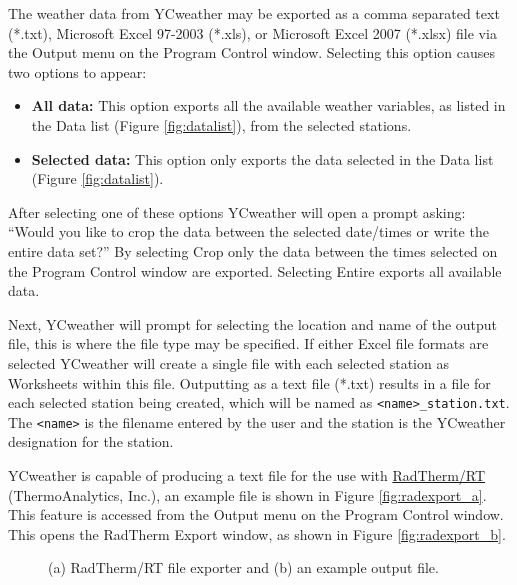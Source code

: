 The weather data from YCweather may be exported as a comma separated text (*.txt), Microsoft Excel 97-2003 (*.xls), or Microsoft Excel 2007 (*.xlsx) file via the Output menu on the Program Control window. Selecting this option causes two options to appear:
\begin{itemize}
     \item \textbf{All data:} This option exports all the available weather variables, as listed in the Data list (Figure \ref{fig:datalist}),  from the selected stations.
	\item \textbf{Selected data:} This option only exports the data selected in the Data list (Figure \ref{fig:datalist}).
\end{itemize} 

After selecting one of these options YCweather will open a prompt asking: ``Would you like to crop the data between the selected date/times or write the entire data set?''  By selecting Crop only the data between the times selected on the Program Control window are exported. Selecting Entire exports all available data.

Next, YCweather will prompt for selecting the location and name of the output file, this is where the file type may be specified.  If either Excel file formats are selected YCweather will create a single file with each selected station as Worksheets within this file.  Outputting as a text file (*.txt) results in a file for each selected station being created, which will be named as \texttt{<name>\_station.txt}. The \texttt{<name>} is the filename entered by the user and the station is the YCweather designation for the station.

YCweather is capable of producing a text file for the use with \href{HTTP://www.thermoanalytics.com/products/radthermrt/index.html}{RadTherm/RT} (ThermoAnalytics, Inc.), an example file is shown in Figure \ref{fig:radexport_a}.  This feature is accessed from the Output menu on the Program Control window.  This opens the RadTherm Export window, as shown in Figure \ref{fig:radexport_b}.

\begin{figure}[ht!]\centering
	\quad
	\caption{(a) RadTherm/RT file exporter and (b) an example output file.}
	\label{fig:radexport}
\end{figure}

